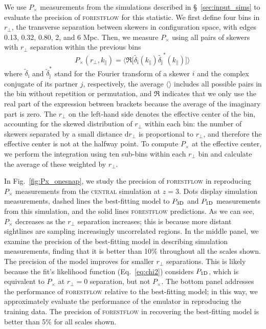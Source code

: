 \documentclass{aa}
\newcommand{\pcross}{$P_{\times}$\xspace}
\newcommand{\poned}{\ensuremath{P_{\rm 1D}}\xspace}
\newcommand{\pthreed}{\ensuremath{P_{\rm 3D}}\xspace}
\newcommand{\forestflow}{\textsc{forestflow}\xspace}
\newcommand{\simcentral}{\textsc{central}\xspace}
\begin{document}
We use \pcross measurements from the simulations described in \S~\ref{sec:input_sims} to evaluate the precision of \forestflow for this statistic. We first define four bins in $r_\perp$, the transverse separation between skewers in configuration space, with edges 0.13, 0.32, 0.80, 2, and 6 Mpc. Then, we measure \pcross using all pairs of skewers with $r_\perp$ separation within the previous bins 
%
\begin{equation}
    P_\times(r_\perp, k_\parallel) = \bigg \langle \Re \Big[\tilde{\delta_\mathrm{i}}(k_\parallel) \tilde{\delta_\mathrm{j}}^*(k_\parallel)\Big]\bigg\rangle \,
\end{equation}
%
where $\tilde{\delta}_\mathrm{i}$ and $\tilde{\delta}^*_\mathrm{j}$ stand for the Fourier transform of a skewer $i$ and the complex conjugate of its partner $j$, respectively, the average $\langle\rangle$ includes all possible pairs in the bin without repetition or permutation, and $\Re$ indicates that we only use the real part of the expression between brackets because the average of the imaginary part is zero. The $r_\perp$ on the left-hand side denotes the effective center of the bin, accounting for the skewed distribution of $r_\perp$ within each bin: the number of skewers separated by a small distance $\mathrm{d}r_\perp$ is proportional to $r_\perp$, and therefore the effective center is not at the halfway point. To compute \pcross at the effective center, we perform the integration using ten sub-bins within each $r_\perp$ bin and calculate the average of these weighted by $r_\perp$.
    
In Fig.~\ref{fig:Px_onesnap}, we study the precision of \forestflow in reproducing \pcross measurements from the \simcentral simulation at $z=3$. Dots display simulation measurements, dashed lines the best-fitting model to \pthreed and \poned measurements from this simulation, and the solid lines \forestflow predictions. As we can see, \pcross decreases as the $r_\perp$ separation increases; this is because more distant sightlines are sampling increasingly uncorrelated regions. In the middle panel, we examine the precision of the best-fitting model in describing simulation measurements, finding that it is better than 10\% throughout all the scales shown. The precision of the model improves for smaller $r_\perp$ separations. This is likely because the fit's likelihood function (Eq.~\ref{eq:chi2}) considers \poned, which is equivalent to \pcross at $r_\perp=0$ separation, but not \pcross. The bottom panel addresses the performance of \forestflow relative to the best-fitting model; in this way, we approximately evaluate the performance of the emulator in reproducing the training data. The precision of \forestflow in recovering the best-fitting model is better than 5\% for all scales shown.
\end{document}
